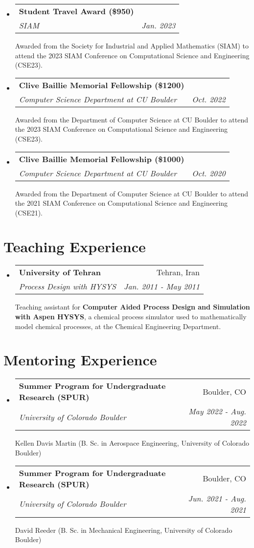 \documentclass[letterpaper,11pt]{article}
\makeatletter
\newcommand{\resumeSubheading}[4]{
  \vspace{-1pt}\item
    \begin{tabular*}{0.97\textwidth}{l@{\extracolsep{\fill}}r}
      \textbf{#1} & #2 \\
      \textit{\small#3} & \textit{\small #4} \\
    \end{tabular*}\vspace{-5pt}
}
\newcommand{\resumeSubHeadingListStart}{\begin{itemize}[leftmargin=*]}
\newcommand{\resumeSubHeadingListEnd}{\end{itemize}}
\makeatother
\begin{document}
\resumeSubHeadingListStart
  \resumeSubheading
  {Student Travel Award (\$950)}{}
  {SIAM}{Jan. 2023}
  \vspace{.1 mm}

  Awarded from the Society for Industrial and Applied Mathematics (SIAM) to attend the 2023 SIAM Conference on Computational Science and Engineering (CSE23).

  \resumeSubheading
  {Clive Baillie Memorial Fellowship (\$1200)}{}
  {Computer Science Department at CU Boulder}{Oct. 2022}
  \vspace{.1 mm}

  Awarded from the Department of Computer Science at CU Boulder to attend the 2023 SIAM Conference on Computational Science and Engineering (CSE23).

  \resumeSubheading
  {Clive Baillie Memorial Fellowship (\$1000)}{}
  {Computer Science Department at CU Boulder}{Oct. 2020}
  \vspace{.1 mm}

  Awarded from the Department of Computer Science at CU Boulder to attend the 2021 SIAM Conference on Computational Science and Engineering (CSE21).
\resumeSubHeadingListEnd

\section{Teaching Experience}

\resumeSubHeadingListStart
  \resumeSubheading
    {University of Tehran}{Tehran, Iran}
    {Process Design with HYSYS}{Jan. 2011 - May 2011}
    \vspace{.1 mm}

    Teaching assistant for \textbf{Computer Aided Process Design and Simulation with Aspen HYSYS}, a chemical process simulator used to mathematically model chemical processes, at the Chemical Engineering Department.

\resumeSubHeadingListEnd

\section{Mentoring Experience}

\resumeSubHeadingListStart

  \resumeSubheading
    {Summer Program for Undergraduate Research (SPUR)}{Boulder, CO}
    {University of Colorado Boulder}{May 2022 - Aug. 2022}
    \vspace{.1 mm}

    Kellen Davis Martin (B. Sc. in Aerospace Engineering, University of Colorado Boulder)

  \resumeSubheading
    {Summer Program for Undergraduate Research (SPUR)}{Boulder, CO}
    {University of Colorado Boulder}{Jun. 2021 - Aug. 2021}
    \vspace{.1 mm}

    David Reeder (B. Sc. in Mechanical Engineering, University of Colorado Boulder)

\resumeSubHeadingListEnd

\end{document}
